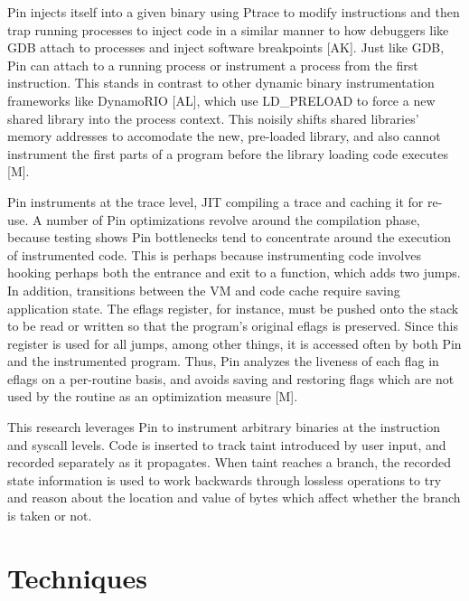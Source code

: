 \documentclass[11pt,expanded,copyright]{fsuthesis}
\begin{document}
Pin injects itself into a given binary using Ptrace to modify instructions and then trap running processes to inject code in a similar manner to how debuggers like GDB attach to processes and inject software breakpoints [AK]. Just like GDB, Pin can attach to a running process or instrument a process from the first instruction. This stands in contrast to other dynamic binary instrumentation frameworks like DynamoRIO [AL], which use LD\_PRELOAD to force a new  shared library into the process context. This noisily shifts shared libraries' memory addresses to accomodate the new, pre-loaded library, and also cannot instrument the first parts of a program before the library loading code executes [M].

Pin instruments at the trace level, JIT compiling a trace and caching it for re-use. A number of Pin optimizations revolve around the compilation phase, because testing shows Pin bottlenecks tend to concentrate around the execution of instrumented code. This is perhaps because instrumenting code involves hooking perhaps both the entrance and exit to a function, which adds two jumps. In addition, transitions between the VM and code cache require saving application state. The eflags register, for instance, must be pushed onto the stack to be read or written so that the program's original eflags is preserved. Since this register is used for all jumps, among other things, it is accessed often by both Pin and the instrumented program. Thus, Pin analyzes the liveness of each flag in eflags on a per-routine basis, and avoids saving and restoring flags which are not used by the routine as an optimization measure [M].

This research leverages Pin to instrument arbitrary binaries at the instruction and syscall levels. Code is inserted to track taint introduced by user input, and recorded separately as it propagates. When taint reaches a branch, the recorded state information is used to work backwards through lossless operations to try and reason about the location and value of bytes which affect whether the branch is taken or not.

\chapter{Techniques}
\end{document}
